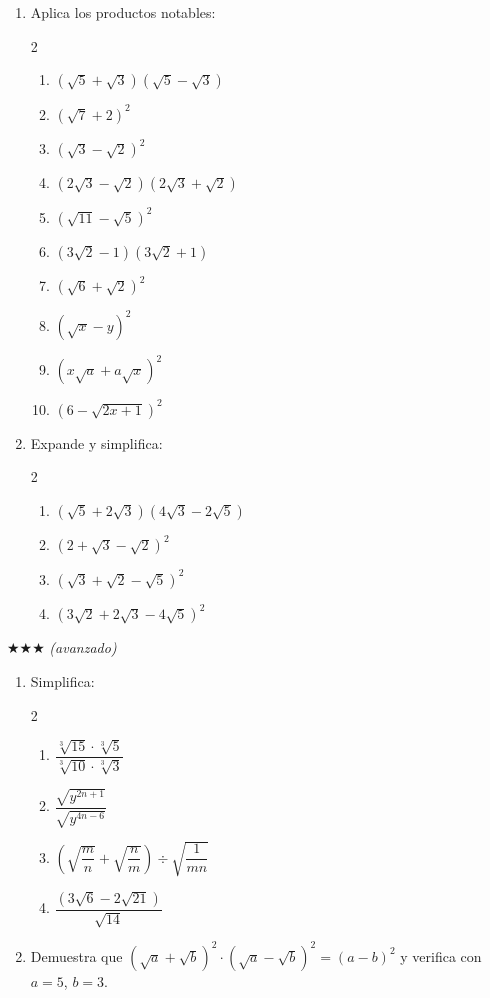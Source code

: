\documentclass[11pt, letterpaper]{article}
\begin{document}
\begin{enumerate}[label=\textbf{\arabic*.}, leftmargin=*, resume]
  \item Aplica los productos notables:
  \begin{multicols}{2}
  \begin{enumerate}[label=\alph*)]
    \item $(\sqrt{5}+\sqrt{3})(\sqrt{5}-\sqrt{3})$
    \item $(\sqrt{7}+2)^2$
    \item $(\sqrt{3}-\sqrt{2})^2$
    \item $(2\sqrt{3}-\sqrt{2})(2\sqrt{3}+\sqrt{2})$
    \item $(\sqrt{11}-\sqrt{5})^2$
    \item $(3\sqrt{2}-1)(3\sqrt{2}+1)$
    \item $(\sqrt{6}+\sqrt{2})^2$
    \item $(\sqrt{x}-y)^2$
    \item $(x\sqrt{a}+a\sqrt{x})^2$
    \item $(6-\sqrt{2x+1})^2$
  \end{enumerate}
  \end{multicols}

  \item Expande y simplifica:
  \begin{multicols}{2}
  \begin{enumerate}[label=\alph*)]
    \item $(\sqrt{5}+2\sqrt{3})(4\sqrt{3}-2\sqrt{5})$
    \item $(2+\sqrt{3}-\sqrt{2})^2$
    \item $(\sqrt{3}+\sqrt{2}-\sqrt{5})^2$
    \item $(3\sqrt{2}+2\sqrt{3}-4\sqrt{5})^2$
  \end{enumerate}
  \end{multicols}
\end{enumerate}

$\bigstar\bigstar\bigstar$ \textit{(avanzado)}

\begin{enumerate}[label=\textbf{\arabic*.}, leftmargin=*, resume]
  \item Simplifica:
  \begin{multicols}{2}
  \begin{enumerate}[label=\alph*)]
    \item $\dfrac{\sqrt[3]{15}\cdot\sqrt[3]{5}}{\sqrt[3]{10}\cdot\sqrt[3]{3}}$
    \item $\dfrac{\sqrt{y^{2n+1}}}{\sqrt{y^{4n-6}}}$
    \item $\left(\sqrt{\dfrac{m}{n}}+\sqrt{\dfrac{n}{m}}\right)\div\sqrt{\dfrac{1}{mn}}$
    \item $\dfrac{(3\sqrt{6}-2\sqrt{21})}{\sqrt{14}}$
  \end{enumerate}
  \end{multicols}

  \item Demuestra que $(\sqrt{a}+\sqrt{b})^2\cdot(\sqrt{a}-\sqrt{b})^2=(a-b)^2$ y verifica con $a=5$, $b=3$.
\end{enumerate}
\end{document}

